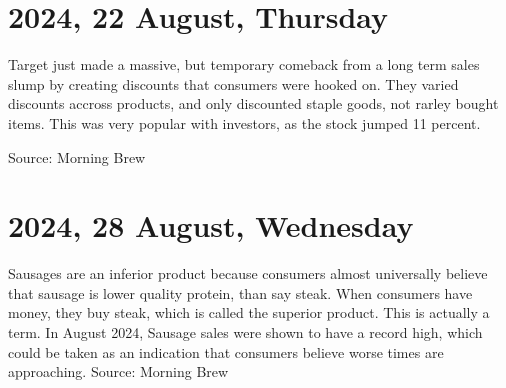 \documentclass{report}
\begin{document}
\section{2024, 22 August, Thursday}
Target just made a massive, but temporary comeback from a long term sales slump by creating discounts that consumers were hooked on. They varied discounts accross products, and only discounted staple goods, not rarley bought items. This was very popular with investors, as the stock jumped 11 percent. 

Source: Morning Brew
\section{2024, 28 August, Wednesday}
Sausages are an inferior product because consumers almost universally believe that sausage is lower quality protein, than say steak. When consumers have money, they buy steak, which is called the superior product. This is actually a term. In August 2024, Sausage sales were shown to have a record high, which could be taken as an indication that consumers believe worse times are approaching. 
Source: Morning Brew
\end{document}
